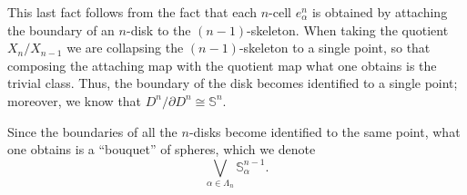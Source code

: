 This last fact follows from the fact that each $n$-cell $e_{\alpha}^n$ is obtained by attaching the boundary of an $n$-disk to the $(n-1)$-skeleton. When taking the quotient $X_n/X_{n-1}$ we are collapsing the $(n-1)$-skeleton to a single point, so that composing the attaching map with the quotient map what one obtains is the trivial class. Thus, the boundary of the disk becomes identified to a single point; moreover, we know that $D^n/\partial D^n \cong \mathbb{S}^n$.

Since the boundaries of all the $n$-disks become identified to the same point, what one obtains is a ``bouquet'' of spheres, which we denote
\begin{equation*}
    \bigvee_{\alpha\in\Lambda_n} \mathbb{S}^{n-1}_{\alpha}. %
\end{equation*}

\bigskip
